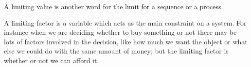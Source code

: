 A limiting value is another word for
the limit for a sequence or a process.

\par
A limiting factor is a variable which acts as
the main constraint on a system. For instance
when we are deciding whether to buy something
or not there may be lots of factors involved
in the decision, like how much we want the object
or what else we could do with the same amount of
money; but the limiting factor is whether or not
we can afford it.
